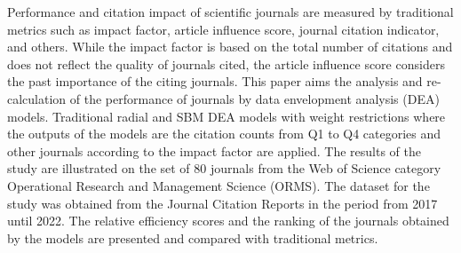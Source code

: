 
\begin{Abstrakt}
    Performance and citation impact of scientific journals are measured by traditional metrics such as impact factor, article influence score, journal citation indicator, and others. While the impact factor is based on the total number of citations and does not reflect the quality of journals cited, the article influence score considers the past importance of the citing journals. This paper aims the analysis and re-calculation of the performance of journals by data envelopment analysis (DEA) models. Traditional radial and SBM DEA models with weight restrictions where the outputs of the models are the citation counts from Q1 to Q4 categories and other journals according to the impact factor are applied. The results of the study are illustrated on the set of 80 journals from the Web of Science category Operational Research and Management Science (ORMS). The dataset for the study was obtained from the Journal Citation Reports in the period from 2017 until 2022. The relative efficiency scores and the ranking of the journals obtained by the models are presented and compared with traditional metrics.
\end{Abstrakt}



\clearpage